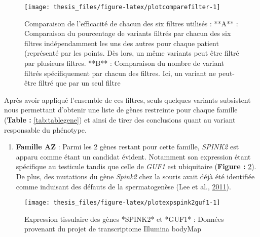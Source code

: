 \documentclass[12pt,twoside]{reedthesis}
\providecommand{\tightlist}{%
  \setlength{\itemsep}{0pt}\setlength{\parskip}{0pt}}
\theoremstyle{definition}
\theoremstyle{definition}
\theoremstyle{remark}
\begin{document}
  \newpage
  
  \begin{figure}
  
  {\centering \texttt{[image: thesis\_files/figure-latex/plotcomparefilter-1]} 
  
  }
  
  \caption[Comparaison de l'efficacité de chacun des six filtres utilisés]{Comparaison de l'efficacité de chacun des six filtres utilisés : **A** : Comparaison du pourcentage de variants filtrés par chacun des six filtres indépendamment les uns des autres pour chaque patient (représenté par les points. Dès lors, un même variants peut être filtré par plusieurs filtres. **B** : Comparaison du nombre de variant filtrés spécifiquement par chacun des filtres. Ici, un variant ne peut-être filtré que par un seul filtre}\label{fig:plotcomparefilter}
  \end{figure}
  
  \newpage
  
  Après avoir appliqué l'ensemble de ces filtres, seuls quelques variants
  subsistent nous permettant d'obtenir une liste de gènes restreinte pour
  chaque famille (\textbf{Table : }\ref{tab:tablegene}) et ainsi de tirer
  des conclusions quant au variant responsable du phénotype.
  
  \begin{enumerate}
  \def\labelenumi{\arabic{enumi}.}
  \tightlist
  \item
    \textbf{Famille AZ} : Parmi les 2 gènes restant pour cette famille,
    \emph{SPINK2} est apparu comme étant un candidat évident. Notamment
    son expression étant spécifique au testicule tandis que celle de
    \emph{GUF1} est ubiquitaire (\textbf{Figure :
    }\ref{fig:plotexpspink2guf1}). De plus, des mutations du gène
    \emph{Spink2} chez la souris avait déjà été identifiée comme induisant
    des défauts de la spermatogenèse (Lee et al.,
    \protect\hyperlink{ref-Lee2011}{2011}).
  \end{enumerate}
  
  \begin{figure}
  
  {\centering \texttt{[image: thesis\_files/figure-latex/plotexpspink2guf1-1]} 
  
  }
  
  \caption[Expression tissulaire des gènes *SPINK2* et *GUF1*]{Expression tissulaire des gènes *SPINK2* et *GUF1* : Données provenant du projet de transcriptome Illumina bodyMap}\label{fig:plotexpspink2guf1}
  \end{figure}
  
\end{document}
